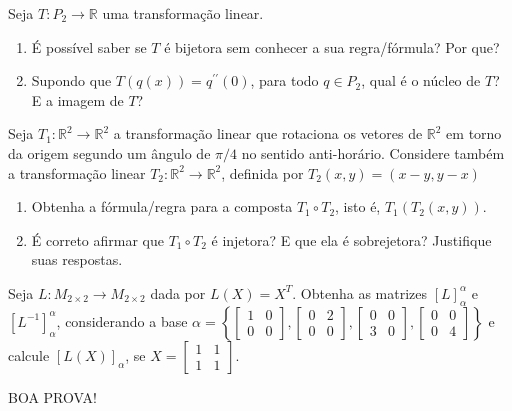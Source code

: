\documentclass[12pt,a4paper]{article}
\newcommand{\fixme}{{\color{red}(...)}}
\newcommand*\R{\mathbb{R}}
\begin{document}
\begin{ExerciseList}
\Exercise[title={2,5}] Seja $T: P_2 \to \R$ uma transformação linear.
\begin{enumerate}
\item É possível saber se $T$ é bijetora sem conhecer a sua regra/fórmula? Por que?
\item Supondo que $T( q(x) ) = q^{\prime\prime}(0)$, para todo $q \in P_2$, qual é o núcleo de $T$? E a imagem de $T$?
\end{enumerate}
\Answer \fixme

\Exercise[title={2,5}] Seja $T_1: \R^2 \to \R^2$ a transformação linear que rotaciona os vetores de $\R^2$ em torno da origem segundo um ângulo de $\pi/4$ no sentido anti-horário. Considere também a transformação linear $T_2: \R^2 \to \R^2$, definida por $T_2(x,y)=(x-y, y-x)$
\begin{enumerate}
\item Obtenha a fórmula/regra para a composta $T_1 \circ T_2$, isto é, $T_1 (T_2(x,y))$.
\item É correto afirmar que $T_1 \circ T_2$ é injetora? E que ela é sobrejetora? Justifique suas respostas.
\end{enumerate}
\Answer \fixme

\Exercise[title={2,5}] Seja $L: M_{2 \times 2} \to M_{2 \times 2}$ dada por $L(X) = X^T$. Obtenha as matrizes $[L]^\alpha_\alpha$ e $[L^{-1}]^\alpha_\alpha$, considerando a base $\alpha = \left\{
\begin{bmatrix}
1 & 0 \\ 0 & 0
\end{bmatrix},
\begin{bmatrix}
0 & 2 \\ 0 & 0
\end{bmatrix},
\begin{bmatrix}
0 & 0 \\ 3 & 0
\end{bmatrix},
\begin{bmatrix}
0 & 0 \\ 0 & 4
\end{bmatrix}
\right\}$ e calcule $[L(X)]_\alpha$, se $X = \begin{bmatrix}
1 & 1 \\ 1 & 1
\end{bmatrix}$.
\Answer \fixme
\end{ExerciseList}

\begin{center}
BOA PROVA!
\end{center}

\end{document}
